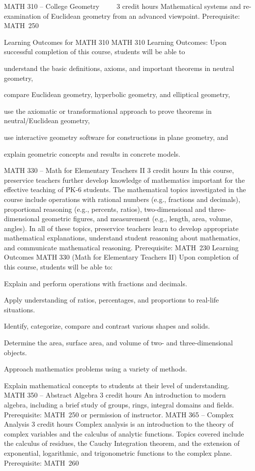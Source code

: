 MATH 310 – College Geometry     3 credit hours
Mathematical systems and re-examination of Euclidean geometry from an advanced viewpoint.
Prerequisite: MATH 250

Learning Outcomes for MATH 310
MATH 310 Learning Outcomes: Upon successful completion of this course, students will be able to
    \item understand the basic definitions, axioms, and important theorems in neutral geometry,
    \item compare Euclidean geometry, hyperbolic geometry, and elliptical geometry,
    \item use the axiomatic or transformational approach to prove theorems in neutral/Euclidean geometry,
    \item use interactive geometry software for constructions in plane geometry, and
    \item explain geometric concepts and results in concrete models.

MATH 330 – Math for Elementary Teachers II 3 credit hours
In this course, preservice teachers further develop knowledge of mathematics important for the effective teaching of PK-6 students. The mathematical topics investigated in the course include operations with rational numbers (e.g., fractions and decimals), proportional reasoning (e.g., percents, ratios), two-dimensional and three-dimensional geometric figures, and measurement (e.g., length, area, volume, angles). In all of these topics, preservice teachers learn to develop appropriate mathematical explanations, understand student reasoning about mathematics, and communicate mathematical reasoning.
Prerequisite: MATH 230
Learning Outcomes MATH 330 (Math for Elementary Teachers II)
Upon completion of this course, students will be able to: 
\item Explain and perform operations with fractions and decimals. 
\item Apply understanding of ratios, percentages, and proportions to real-life situations. 
\item Identify, categorize, compare and contrast various shapes and solids. 
\item Determine the area, surface area, and volume of two- and three-dimensional objects. 
\item Approach mathematics problems using a variety of methods. 
\item Explain mathematical concepts to students at their level of understanding.
MATH 350 – Abstract Algebra 3 credit hours
An introduction to modern algebra, including a brief study of groups, rings, integral domains and fields. Prerequisite: MATH 250 or permission of instructor.
MATH 365 – Complex Analysis 3 credit hours
Complex analysis is an introduction to the theory of complex variables and the calculus of analytic functions. Topics covered include the calculus of residues, the Cauchy Integration theorem, and the extension of exponential, logarithmic, and trigonometric functions to the complex plane.
Prerequisite: MATH 260

